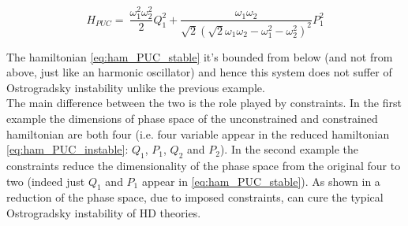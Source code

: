 \begin{equation} \label{eq:ham_PUC_stable}
  H_{PUC} =\ \frac{\omega_1^2\omega_2^2}{2} Q_1^2 +
  \frac{\omega_1\omega_2}{\sqrt{2} \left(\sqrt{2} \omega_1\omega_2 -
  \omega_1^2 - \omega_2^2 \right)^2} P_1^2
\end{equation}

The hamiltonian \eqref{eq:ham_PUC_stable} it's bounded from below (and not from
above, just like an harmonic oscillator) and hence this system does not suffer
of Ostrogradsky instability unlike the previous example. \\

The main difference between the two is the role played by constraints. In the
first example the dimensions of phase space of the unconstrained and constrained
hamiltonian are both four (i.e. four variable appear in the reduced hamiltonian
\eqref{eq:ham_PUC_instable}: $Q_1$, $P_1$, $Q_2$ and $P_2$). In the second
example the constraints reduce the dimensionality of the phase space from the
original four to two (indeed just $Q_1$ and $P_1$ appear in
\eqref{eq:ham_PUC_stable}). As shown in \cite{Chen13} a reduction of the phase
space, due to imposed constraints, can cure the typical Ostrogradsky instability
of HD theories.
